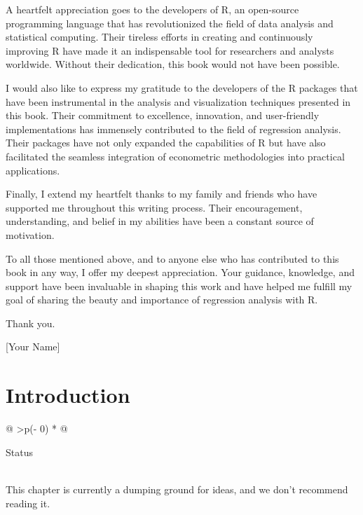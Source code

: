 \documentclass[
  letterpaper,
  twoside,
  openright,
  headsepline,
  footsepline,
  listof = totocnumbered,
  chapterprefix = true,
  titlepage = false]{scrbook}
\begin{document}
A heartfelt appreciation goes to the developers of R, an open-source
programming language that has revolutionized the field of data analysis
and statistical computing. Their tireless efforts in creating and
continuously improving R have made it an indispensable tool for
researchers and analysts worldwide. Without their dedication, this book
would not have been possible.

I would also like to express my gratitude to the developers of the R
packages that have been instrumental in the analysis and visualization
techniques presented in this book. Their commitment to excellence,
innovation, and user-friendly implementations has immensely contributed
to the field of regression analysis. Their packages have not only
expanded the capabilities of R but have also facilitated the seamless
integration of econometric methodologies into practical applications.

Finally, I extend my heartfelt thanks to my family and friends who have
supported me throughout this writing process. Their encouragement,
understanding, and belief in my abilities have been a constant source of
motivation.

To all those mentioned above, and to anyone else who has contributed to
this book in any way, I offer my deepest appreciation. Your guidance,
knowledge, and support have been invaluable in shaping this work and
have helped me fulfill my goal of sharing the beauty and importance of
regression analysis with R.

Thank you.

{[}Your Name{]}


\hypertarget{introduction}{%
\chapter{Introduction}\label{introduction}}

\begin{longtable}[]{@{}
  >{\centering\arraybackslash}p{(\columnwidth - 0\tabcolsep) * }@{}}
\toprule\noalign{}
\begin{minipage}[b]{\linewidth}\centering
Status
\end{minipage} \\
\midrule\noalign{}
\endhead
\bottomrule\noalign{}
\endlastfoot
This chapter is currently a dumping ground for ideas, and we don't
recommend reading it. \\
\end{longtable}
\end{document}
